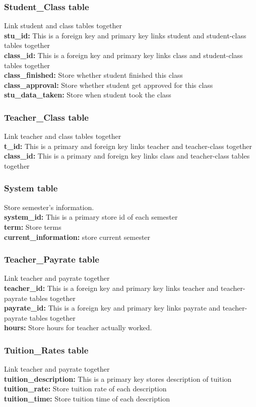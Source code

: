 \subsubsection{Student\_Class table}
Link student and class tables together\\
\textbf{stu\_id:} This is a foreign key and primary key links student and student-class tables together\\
\textbf{class\_id:} This is a foreign key and primary key links class and student-class tables together\\
\textbf{class\_finished:} Store whether student finished this class\\
\textbf{class\_approval:} Store whether student get approved for this class\\
\textbf{stu\_data\_taken:} Store when student took the class

\subsubsection{Teacher\_Class table}
Link teacher and class tables together\\
\textbf{t\_id:} This is a primary and foreign key links teacher and teacher-class together\\
\textbf{class\_id:} This is a primary and foreign key links class and teacher-class tables together 

\subsubsection{System table}
Store semester's information.\\
\textbf{system\_id:} This is a primary store id of each semester\\
\textbf{term:} Store terms\\
\textbf{current\_information:} store current semester

\subsubsection{Teacher\_Payrate table}
Link teacher and payrate together\\
\textbf{teacher\_id:} This is a foreign key and primary key links teacher and teacher-payrate tables together\\
\textbf{payrate\_id:} This is a foreign key and primary key links payrate and teacher-payrate tables together\\
\textbf{hours:} Store hours for teacher actually worked.

\subsubsection{Tuition\_Rates table}
Link teacher and payrate together\\
\textbf{tuition\_description:} This is a primary key stores description of tuition\\
\textbf{tuition\_rate:} Store tuition rate of each description\\
\textbf{tuition\_time:} Store tuition time of each description

